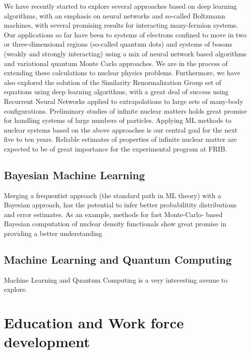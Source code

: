 \documentclass[%
oneside,                 %
final,                   %
10pt]{article}
\begin{document}
We have recently started to explore several approaches based on deep
learning algorithms, with an emphasis on neural networks and so-called
Boltzmann machines, with several promising results for interacting
many-fermion systems. Our applications
so far have been to systems of electrons confined to move in two or
three-dimensional regions (so-called quantum dots) and systems of
bosons (weakly and strongly interacting) using a mix of neural network
based algorithms and variational quantum Monte Carlo approaches. We are in the process of extending these calculations
to nuclear physics problems. 
Furthermore, we have also explored the solution of the Similarity
Renormalization Group set of equations using deep learning algorithms, with a great deal of success using Recurrent Neural Networks
applied to extrapolations to large sets of many-body configurations. Preliminary studies of infinite nuclear matters holds great promise for handling systems of large numbers of particles.
Applying ML methods to nuclear systems based on the above
approaches is our central goal for the next five to ten years.  Reliable estimates of properties of infinite nuclear matter are expected to be of great importance for the experimental program at FRIB.




\subsection{Bayesian Machine Learning}

Merging a frequentist approach (the standard path in ML theory) with a Bayesian approach, has the potential to infer better probabilitity distributions and error estimates. As an example, methods for fast Monte-Carlo- based Bayesian computation of nuclear density functionals show great promise in providing a better understanding 

\subsection{Machine Learning and Quantum Computing}
Machine Learning and Quantum Computing is a very interesting avenue to explore.



\section{Education and Work force development}
\end{document}
